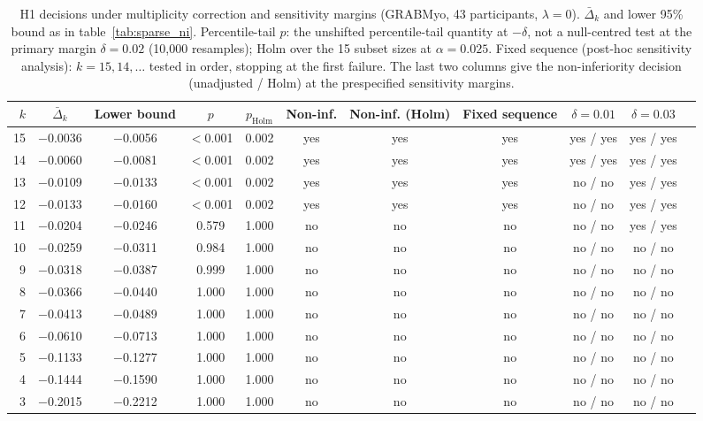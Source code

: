 \begin{table}[htbp]
\centering
\small
\caption{H1 decisions under multiplicity correction and sensitivity margins (GRABMyo, 43 participants, $\lambda = 0$). $\bar\Delta_k$ and lower 95\% bound as in table~\ref{tab:sparse_ni}. Percentile-tail $p$: the unshifted percentile-tail quantity at $-\delta$, not a null-centred test at the primary margin $\delta = 0.02$ (10,000 resamples); Holm over the 15 subset sizes at $\alpha = 0.025$. Fixed sequence (post-hoc sensitivity analysis): $k = 15, 14, \ldots$ tested in order, stopping at the first failure. The last two columns give the non-inferiority decision (unadjusted / Holm) at the prespecified sensitivity margins.}
\label{tab:h1_holm}
\setlength{\tabcolsep}{4pt}
\begin{adjustbox}{max width=\textwidth}
\begin{tabular}{rcccccccccc}
\toprule
$k$ & $\bar\Delta_k$ & Lower bound & $p$ & $p_{\mathrm{Holm}}$ & Non-inf. & Non-inf. (Holm) & Fixed sequence & $\delta = 0.01$ & $\delta = 0.03$ \\
\midrule
15 & $-$0.0036 & $-$0.0056 & $<$0.001 & 0.002 & yes & yes & yes & yes / yes & yes / yes \\
14 & $-$0.0060 & $-$0.0081 & $<$0.001 & 0.002 & yes & yes & yes & yes / yes & yes / yes \\
13 & $-$0.0109 & $-$0.0133 & $<$0.001 & 0.002 & yes & yes & yes & no / no & yes / yes \\
12 & $-$0.0133 & $-$0.0160 & $<$0.001 & 0.002 & yes & yes & yes & no / no & yes / yes \\
11 & $-$0.0204 & $-$0.0246 & 0.579 & 1.000 & no & no & no & no / no & yes / yes \\
10 & $-$0.0259 & $-$0.0311 & 0.984 & 1.000 & no & no & no & no / no & no / no \\
9 & $-$0.0318 & $-$0.0387 & 0.999 & 1.000 & no & no & no & no / no & no / no \\
8 & $-$0.0366 & $-$0.0440 & 1.000 & 1.000 & no & no & no & no / no & no / no \\
7 & $-$0.0413 & $-$0.0489 & 1.000 & 1.000 & no & no & no & no / no & no / no \\
6 & $-$0.0610 & $-$0.0713 & 1.000 & 1.000 & no & no & no & no / no & no / no \\
5 & $-$0.1133 & $-$0.1277 & 1.000 & 1.000 & no & no & no & no / no & no / no \\
4 & $-$0.1444 & $-$0.1590 & 1.000 & 1.000 & no & no & no & no / no & no / no \\
3 & $-$0.2015 & $-$0.2212 & 1.000 & 1.000 & no & no & no & no / no & no / no \\

\end{tabular}
\end{adjustbox}
\end{table}
